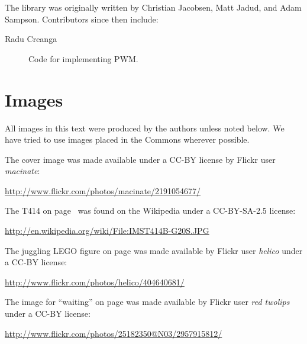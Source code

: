 The \plumbing library was originally written by Christian Jacobsen, Matt Jadud, and Adam Sampson. Contributors since then include:

\begin{description}
	\item[Radu Creanga] Code for implementing PWM.
\end{description}

\newpage

\section{Images}
All images in this text were produced by the authors unless noted below. We have tried to use images placed in the Commons wherever possible.

The cover image was made available under a CC-BY license by Flickr user {\em macinate}:

\small{\url{http://www.flickr.com/photos/macinate/2191054677/}}

The T414 on page~\pageref{image:t414} was found on the Wikipedia under a CC-BY-SA-2.5 license:

\small{\url{http://en.wikipedia.org/wiki/File:IMST414B-G20S.JPG}}

The juggling LEGO figure on page \pageref{image:juggling} was made available by Flickr user {\em helico} under a CC-BY license:

\small{\url{http://www.flickr.com/photos/helico/404640681/}}

The image for ``waiting'' on page \pageref{medio:waiting} was made available by Flickr user {\em red twolips} under a CC-BY license:

\small{\url{http://www.flickr.com/photos/25182350@N03/2957915812/}}

